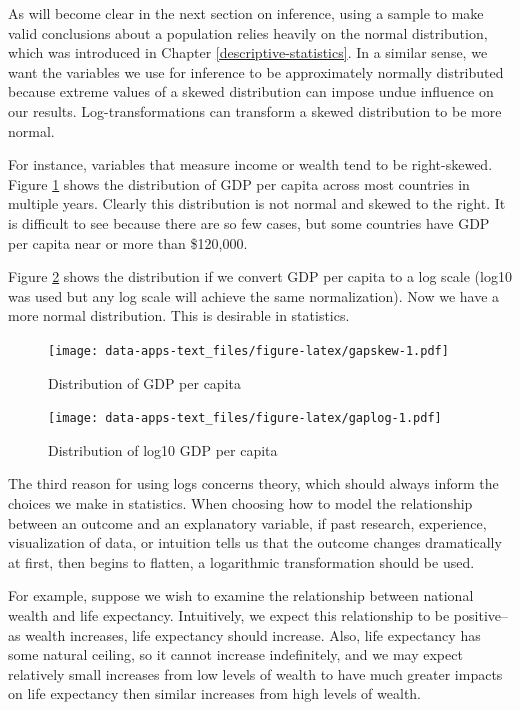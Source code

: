 \documentclass[
]{book}
\begin{document}
As will become clear in the next section on inference, using a sample to make valid conclusions about a population relies heavily on the normal distribution, which was introduced in Chapter \ref{descriptive-statistics}. In a similar sense, we want the variables we use for inference to be approximately normally distributed because extreme values of a skewed distribution can impose undue influence on our results. Log-transformations can transform a skewed distribution to be more normal.

For instance, variables that measure income or wealth tend to be right-skewed. Figure \ref{fig:gapskew} shows the distribution of GDP per capita across most countries in multiple years. Clearly this distribution is not normal and skewed to the right. It is difficult to see because there are so few cases, but some countries have GDP per capita near or more than \$120,000.

Figure \ref{fig:gaplog} shows the distribution if we convert GDP per capita to a log scale (log10 was used but any log scale will achieve the same normalization). Now we have a more normal distribution. This is desirable in statistics.

\begin{figure}
\centering
\texttt{[image: data-apps-text\_files/figure-latex/gapskew-1.pdf]}
\caption{\label{fig:gapskew}Distribution of GDP per capita}
\end{figure}

\begin{figure}
\centering
\texttt{[image: data-apps-text\_files/figure-latex/gaplog-1.pdf]}
\caption{\label{fig:gaplog}Distribution of log10 GDP per capita}
\end{figure}

The third reason for using logs concerns theory, which should always inform the choices we make in statistics. When choosing how to model the relationship between an outcome and an explanatory variable, if past research, experience, visualization of data, or intuition tells us that the outcome changes dramatically at first, then begins to flatten, a logarithmic transformation should be used.

For example, suppose we wish to examine the relationship between national wealth and life expectancy. Intuitively, we expect this relationship to be positive--as wealth increases, life expectancy should increase. Also, life expectancy has some natural ceiling, so it cannot increase indefinitely, and we may expect relatively small increases from low levels of wealth to have much greater impacts on life expectancy then similar increases from high levels of wealth.
\end{document}
